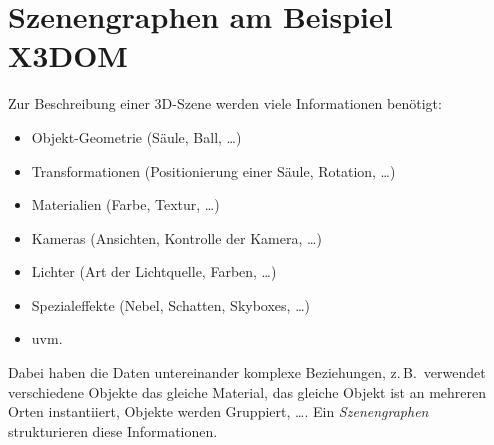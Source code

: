\documentclass[a4paper, 11pt, accentcolor = tud3b]{tudreport}
\newcommand{\zB}{z.\,B.~}
\begin{document}
	\chapter{Szenengraphen am Beispiel X3DOM}
		Zur Beschreibung einer 3D-Szene werden viele Informationen benötigt:
		\begin{itemize}
			\item Objekt-Geometrie (Säule, Ball, \dots)
			\item Transformationen (Positionierung einer Säule, Rotation, \dots)
			\item Materialien (Farbe, Textur, \dots)
			\item Kameras (Ansichten, Kontrolle der Kamera, \dots)
			\item Lichter (Art der Lichtquelle, Farben, \dots)
			\item Spezialeffekte (Nebel, Schatten, Skyboxes, \dots)
			\item uvm.
		\end{itemize}
		Dabei haben die Daten untereinander komplexe Beziehungen, \zB verwendet verschiedene Objekte das gleiche Material, das gleiche Objekt ist an mehreren Orten instantiiert, Objekte werden Gruppiert, \dots. Ein \emph{Szenengraphen} strukturieren diese Informationen.
		
\end{document}
